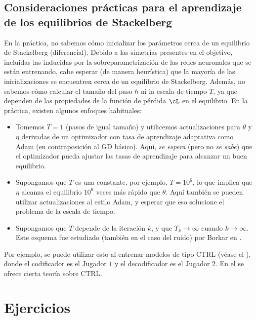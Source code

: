 \documentclass[../../book-main_es.tex]{subfiles}
\begin{document}
\subsection{Consideraciones prácticas para el aprendizaje de los equilibrios de Stackelberg}

En la práctica, no sabemos cómo inicializar los parámetros cerca de un
equilibrio de Stackelberg (diferencial). Debido a las simetrías presentes en el
objetivo, incluidas las inducidas por la sobreparametrización de las
redes neuronales que se están entrenando, cabe esperar (de manera heurística) que
la mayoría de las inicializaciones se encuentren cerca de un equilibrio de Stackelberg. Además,
no sabemos cómo calcular el tamaño del paso \(h\) ni la escala de tiempo
\(T\), ya que dependen de las propiedades de la función de pérdida \(\cL\) en
el equilibrio. En la práctica, existen algunos enfoques habituales:
\begin{itemize}
    \item Tomemos \(T = 1\) (pasos de igual tamaño) y utilicemos actualizaciones para
        \(\theta\) y \(\eta\) derivadas de un
        optimizador con tasa de aprendizaje adaptativa como Adam (en contraposición al
        GD básico). Aquí, \textit{se espera} (pero no
        \textit{se sabe}) que el optimizador pueda ajustar las tasas de aprendizaje
        para alcanzar un buen equilibrio.
    \item Supongamos que \(T\) es una constante, por ejemplo, \(T = 10^{6}\), lo que
        implica que \(\eta\) alcanza el equilibrio \(10^{6}\) veces más rápido
        que \(\theta\). Aquí también se pueden utilizar actualizaciones al estilo Adam, y
        esperar que eso solucione el problema de la escala de tiempo.
    \item Supongamos que \(T\) depende de la iteración \(k\), y que \(T_{k}
        \to \infty\) cuando \(k \to \infty\). Este esquema fue estudiado
        (también en el caso del ruido) por Borkar en \cite{borkar1997stochastic}.
\end{itemize}
Por ejemplo, se puede utilizar esto al entrenar modelos de tipo CTRL (véase el
), donde el codificador es el Jugador \(1\) y el
decodificador es el Jugador \(2\). En el
 se ofrece cierta teoría sobre CTRL.

\section{Ejercicios}
\end{document}
